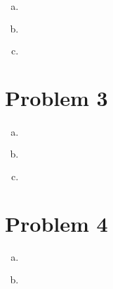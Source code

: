 \documentclass{article}
\begin{document}
\begin{flushleft}
\begin{enumerate}[(a)]
	\item 
\begin{multline*}\\
\end{multline*}

	\item 
\begin{multline*}\\
\end{multline*}

	\item 
\begin{multline*}\\
\end{multline*}
	
\end{enumerate}

	\section*{Problem 3}
	
\begin{enumerate}[(a)]
	\item 
\begin{multline*}\\
\end{multline*}
	
	\item 
\begin{multline*}\\
\end{multline*}

	\item 
\begin{multline*}\\
\end{multline*}
	
\end{enumerate}

	\section*{Problem 4}
	
\begin{enumerate}[(a)]
	
	\item 	
\begin{multline*}\\
\end{multline*}

	\item 
\begin{multline*}
\end{multline*}


\end{enumerate}
\end{flushleft}
\end{document}
